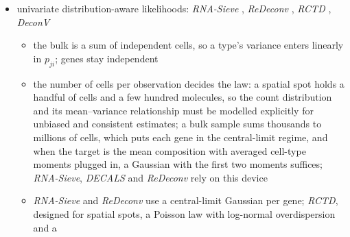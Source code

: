 \documentclass[pdflatex, sn-nature]{sn-jnl}
\theoremstyle{thmstyleone}%
\theoremstyle{thmstyletwo}%
\theoremstyle{thmstylethree}%
\begin{document}
\begin{itemize}
\begin{itemize}
          expression of the last gene is fixed by the others, the covariance becomes singular, and
          genes that were independent become negatively correlated
          \cite{aitchisonStatisticalAnalysisCompositional1982}; for independent genes with
          variances \(v_{g}\), normalised mean \(z_{g}\) and library size \(L\), the delta method gives
          \(\operatorname{Cov}(z_{g},z_{g'})\approx-(z_{g}v_{g'}+z_{g'}v_{g}-z_{g}z_{g'}\sum_{h}v_{h})/L^{2}\) for \(g\neq g'\)
          (Appendix~\ref{app:alignment}); the gene network estimated on raw counts is then no longer the
          network of the normalised bulk, and the target becomes transcript fractions
    \item output: a point estimate on the simplex, from \(\nu\)-support vector regression,
          quadratic programming or weighted non-negative least squares (NNLS)
          \cite{dessoleLawsonHansonAlgorithmDeviation2023}
  \end{itemize}
  \item univariate distribution-aware likelihoods:
        \emph{RNA-Sieve} \cite{erdmann-phamLikelihoodbasedDeconvolutionBulk2021},
        \emph{ReDeconv} \cite{luTranscriptomeSizeMatters2025},
        \emph{RCTD} \cite{cableRobustDecompositionCell2022a},
        \emph{DeconV} \cite{gynterDeconvProbabilisticCellType2023}
  \begin{itemize}
    \item the bulk is a sum of independent cells, so a type's variance enters linearly in
          \(p_{ji}\); genes stay independent
    \item the number of cells per observation decides the law: a spatial spot holds a handful of
          cells and a few hundred molecules, so the count distribution and its mean--variance
          relationship must be modelled explicitly for unbiased and consistent estimates; a bulk
          sample sums thousands to millions of cells, which puts each gene in the central-limit
          regime, and when the target is the mean composition with averaged cell-type moments
          plugged in, a Gaussian with the first two moments suffices; \emph{RNA-Sieve},
          \emph{DECALS} and \emph{ReDeconv} rely on this device
          \cite{erdmann-phamLikelihoodbasedDeconvolutionBulk2021,caiStatisticalInferenceCelltype2024,luTranscriptomeSizeMatters2025}
    \item \emph{RNA-Sieve} and \emph{ReDeconv} use a central-limit Gaussian per gene;
          \emph{RCTD}, designed for spatial spots, a Poisson law with log-normal overdispersion and a

\end{itemize}
\end{itemize}
\end{document}
